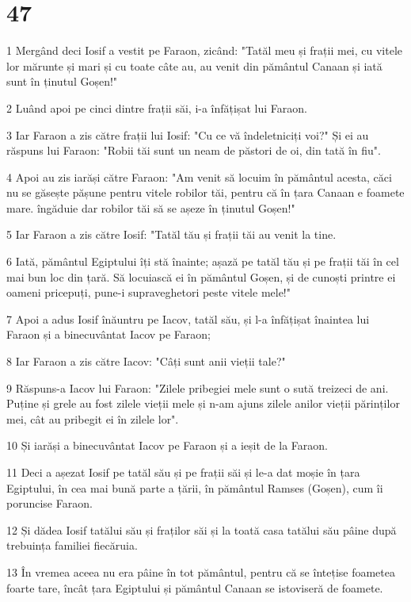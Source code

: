 \chapter{47}

\par 1 Mergând deci Iosif a vestit pe Faraon, zicând: "Tatăl meu și frații mei, cu vitele lor mărunte și mari și cu toate câte au, au venit din pământul Canaan și iată sunt în ținutul Goșen!"
\par 2 Luând apoi pe cinci dintre frații săi, i-a înfățișat lui Faraon.
\par 3 Iar Faraon a zis către frații lui Iosif: "Cu ce vă îndeletniciți voi?" Și ei au răspuns lui Faraon: "Robii tăi sunt un neam de păstori de oi, din tată în fiu".
\par 4 Apoi au zis iarăși către Faraon: "Am venit să locuim în pământul acesta, căci nu se găsește pășune pentru vitele robilor tăi, pentru că în țara Canaan e foamete mare. îngăduie dar robilor tăi să se așeze în ținutul Goșen!"
\par 5 Iar Faraon a zis către Iosif: "Tatăl tău și frații tăi au venit la tine.
\par 6 Iată, pământul Egiptului îți stă înainte; așază pe tatăl tău și pe frații tăi în cel mai bun loc din țară. Să locuiască ei în pământul Goșen, și de cunoști printre ei oameni pricepuți, pune-i supraveghetori peste vitele mele!"
\par 7 Apoi a adus Iosif înăuntru pe Iacov, tatăl său, și l-a înfățișat înaintea lui Faraon și a binecuvântat Iacov pe Faraon;
\par 8 Iar Faraon a zis către Iacov: "Câți sunt anii vieții tale?"
\par 9 Răspuns-a Iacov lui Faraon: "Zilele pribegiei mele sunt o sută treizeci de ani. Puține și grele au fost zilele vieții mele și n-am ajuns zilele anilor vieții părinților mei, cât au pribegit ei în zilele lor".
\par 10 Și iarăși a binecuvântat Iacov pe Faraon și a ieșit de la Faraon.
\par 11 Deci a așezat Iosif pe tatăl său și pe frații săi și le-a dat moșie în țara Egiptului, în cea mai bună parte a țării, în pământul Ramses (Goșen), cum îi poruncise Faraon.
\par 12 Și dădea Iosif tatălui său și fraților săi și la toată casa tatălui său pâine după trebuința familiei fiecăruia.
\par 13 În vremea aceea nu era pâine în tot pământul, pentru că se întețise foametea foarte tare, încât țara Egiptului și pământul Canaan se istoviseră de foamete.
